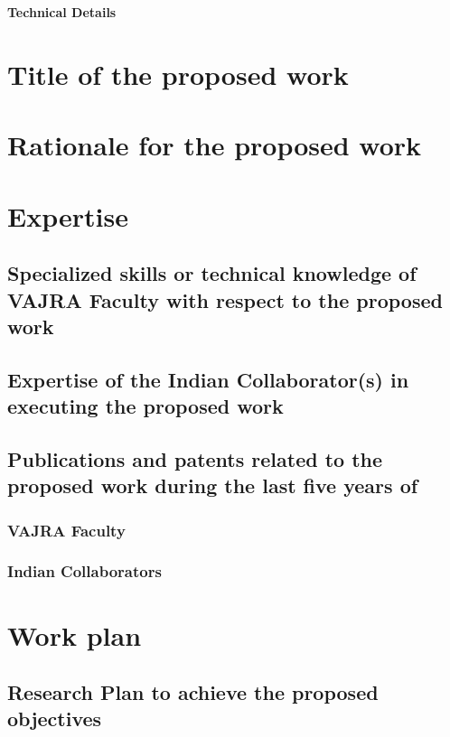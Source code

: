\documentclass[twoside]{article}
\begin{document}
\begin{center}
\bf{\LARGE{Technical Details}}
\end{center}
\section{Title of the proposed work}

\section{Rationale for the proposed work}%

\section{Expertise}
\subsection{Specialized skills or technical knowledge of VAJRA Faculty with respect to the proposed work}

\subsection{Expertise of the Indian Collaborator(s) in executing the proposed work}

\subsection{Publications and patents related to the proposed work during the last five years of}
\subsubsection{VAJRA Faculty}

\subsubsection{Indian Collaborators}


\section{Work plan}
\subsection{Research Plan to achieve the proposed objectives}
\end{document}
